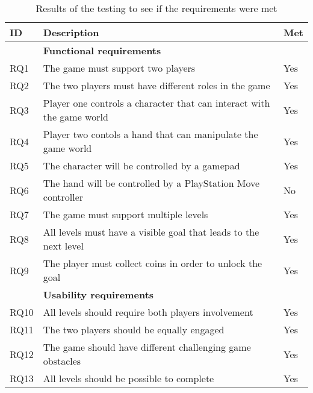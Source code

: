 \begin{table}[!ht]
	\centering
	\caption{Results of the testing to see if the requirements were met}
	\label{tab:requirements_met}
	\begin{tabularx}{\textwidth}{|l|X|l|}
		\hline
		\textbf{ID} & \textbf{Description}                                                  & \textbf{Met} \\ \hline
		            & \textbf{Functional requirements}                                      &  \\ \hline
		RQ1         & The game must support two players                                     & Yes          \\
		RQ2         & The two players must have different roles in the game                 & Yes          \\
		RQ3         & Player one controls a character that can interact with the game world & Yes          \\
		RQ4         & Player two contols a hand that can manipulate the game world          & Yes          \\
		RQ5         & The character will be controlled by a gamepad                         & Yes          \\
		RQ6         & The hand will be controlled by a PlayStation Move controller          & No           \\
		RQ7         & The game must support multiple levels                                 & Yes          \\
		RQ8         & All levels must have a visible goal that leads to the next level      & Yes          \\
		RQ9         & The player must collect coins in order to unlock the goal             & Yes          \\ \hline
		            & \textbf{Usability requirements}                                       &  \\ \hline
		RQ10        & All levels should require both players involvement                    & Yes          \\
		RQ11        & The two players should be equally engaged                             & Yes          \\
		RQ12        & The game should have different challenging game obstacles             & Yes          \\
		RQ13        & All levels should be possible to complete                             & Yes          \\ \hline
	\end{tabularx}
\end{table}

